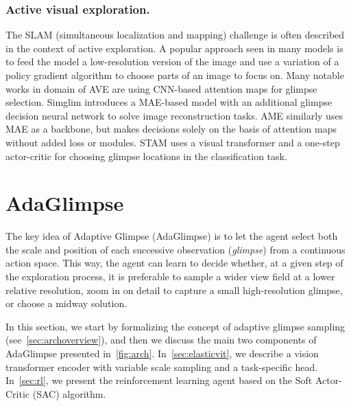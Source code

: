 \documentclass[runningheads]{llncs}
\newcommand{\ours}[0]{AdaGlimpse}
\begin{document}
\subsubsection{Active visual exploration.} 
The SLAM (simultaneous localization and mapping) challenge is often described in the context of active exploration\cite{ramakrishnan2021exploration}. 
A popular approach seen in many models\cite{ba2015multiple,elsayed2019saccader,papadopoulos2021hard,uzkent2020learning} is to feed the model a low-resolution version of the image and use a variation of a policy gradient algorithm to choose parts of an image to focus on.
Many notable works in domain of AVE are using CNN-based attention maps for glimpse selection\cite{seifi2020attend,seifi2021glimpse,seifi2019wheretolooknext,wang2020glance}. 
Simglim \cite{jha2023simglim} introduces a MAE-based model with an additional glimpse decision neural network to solve image reconstruction tasks. 
AME\cite{pardyl2023active} similarly uses MAE as a backbone, but makes decisions solely on the basis of attention maps without added loss or modules.
STAM\cite{rangrej2022consistency} uses a visual transformer and a one-step actor-critic for choosing glimpse locations in the classification task.

\section{\ours{}}
\label{sec:ours}

The key idea of Adaptive Glimpse (\ours{}) is to let the agent select both the scale and position of each successive observation (\textit{glimpse}) from a continuous action space. This way, the agent can learn to decide whether, at a given step of the exploration process, it is preferable to sample a wider view field at a lower relative resolution, zoom in on detail to capture a small high-resolution glimpse, or choose a midway solution.

In this section, we start by formalizing the concept of adaptive glimpse sampling (see~\cref{sec:archoverview}), and then we discuss the main two components of \ours{} presented in~\cref{fig:arch}. In~\cref{sec:elasticvit}, we describe a vision transformer encoder with variable scale sampling and a task-specific head. In~\cref{sec:rl}, we present the reinforcement learning agent based on the Soft Actor-Critic (SAC) algorithm.
\end{document}

